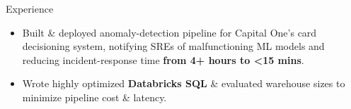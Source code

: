 \documentclass{resume} %
\begin{document}
\begin{workSection}{Experience}
	
	\experienceItem[
	company=Primer.com,
	location=San Francisco{,} CA,
	position=Incoming Software Engineering Intern,
	duration= December 2025 - May 2026,
	]
	
	\experienceItem[
	company=Capital One,
	location=McLean{,} VA,
	position=Software Engineering Intern,
	duration= June 2025 - August 2025,
	]
	\begin{itemize}
		\vspace{-0.5em}
		\itemsep -6pt {}
		\item Built \& deployed anomaly-detection pipeline for Capital One's card decisioning system, notifying SREs of malfunctioning ML models and reducing incident-response time \textbf{from 4+ hours to <15 mins}.
		\item Wrote highly optimized \textbf{Databricks SQL} \& evaluated warehouse sizes to minimize pipeline cost \& latency.

		

\end{itemize}
\end{workSection}
\end{document}
